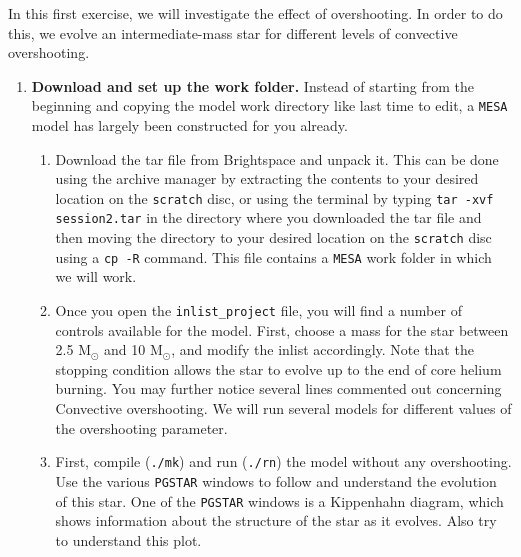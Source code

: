 \documentclass[11pt,a4paper]{article}
\begin{document}
In this first exercise, we will investigate the effect of overshooting. In order to do this, we evolve an intermediate-mass star for different levels of convective overshooting.


\begin{enumerate}

\item \textbf{Download and set up the work folder.} 
Instead of starting from the beginning and copying the model work directory like last time to edit, a \texttt{MESA} model has largely been constructed for you already. 


\begin{enumerate} 

    \item Download the tar file from Brightspace and unpack it. This can be done using the archive manager by extracting the contents to your desired location on the \texttt{scratch} disc, or using the terminal by typing \verb|tar -xvf session2.tar| in the directory where you downloaded the tar file and then moving the directory to your desired location on the \texttt{scratch} disc using a \texttt{cp -R} command. This file contains a \texttt{MESA} work folder in which we will work. 
    
    \item Once you open the \verb|inlist_project| file, you will find a number of controls available for the model. First, choose a mass for the star between 2.5 M$_\odot$ and 10 M$_\odot$, and modify the inlist accordingly. Note that the stopping condition allows the star to evolve up to the end of core helium burning. You may further notice several lines commented out concerning Convective overshooting. We will run several models for different values of the overshooting parameter. 

    \item First, compile (\verb|./mk|) and run (\verb|./rn|) the model without any overshooting. 
    Use the various \texttt{PGSTAR} windows to follow and understand the evolution of this star. One of the \texttt{PGSTAR} windows is a Kippenhahn diagram, which shows information about the structure of the star as it evolves. Also try to understand this plot.



\end{enumerate}
\end{enumerate}
\end{document}
